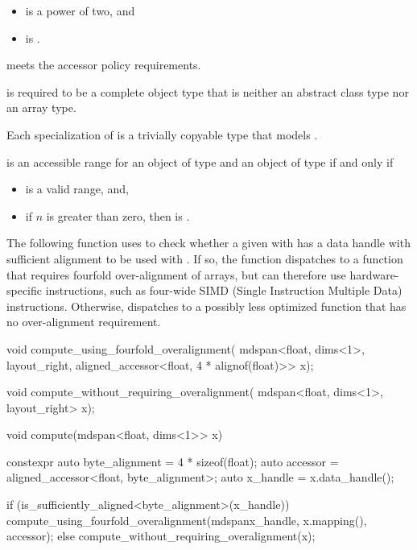 \pnum
\mandates
\begin{itemize}
\item {} is a power of two, and
\item {} is .
\end{itemize}

\pnum
{} meets the accessor policy requirements.

\pnum
{} is required to be a complete object type
that is neither an abstract class type nor an array type.

\pnum
Each specialization of  is
a trivially copyable type that models .

\pnum
{} is an accessible range
for an object  of type  and
an object of type  if and only if
\begin{itemize}
\item
{} is a valid range, and,
\item
if $n$ is greater than zero,
then  is .
\end{itemize}

\pnum
\begin{example}
The following function 
uses  to check
whether a given  with  has
a data handle with sufficient alignment
to be used with .
If so, the function dispatches to
a function 
that requires fourfold over-alignment of arrays,
but can therefore use hardware-specific instructions,
such as four-wide SIMD (Single Instruction Multiple Data) instructions.
Otherwise,  dispatches to a
possibly less optimized function 
that has no over-alignment requirement.
\begin{codeblock}
void compute_using_fourfold_overalignment(
  mdspan<float, dims<1>, layout_right, aligned_accessor<float, 4 * alignof(float)>> x);

void compute_without_requiring_overalignment(
  mdspan<float, dims<1>, layout_right> x);

void compute(mdspan<float, dims<1>> x) {
  constexpr auto byte_alignment = 4 * sizeof(float);
  auto accessor = aligned_accessor<float, byte_alignment>{};
  auto x_handle = x.data_handle();

  if (is_sufficiently_aligned<byte_alignment>(x_handle)) {
    compute_using_fourfold_overalignment(mdspan{x_handle, x.mapping(), accessor});
  } else {
    compute_without_requiring_overalignment(x);
  }
}
\end{codeblock}
\end{example}

